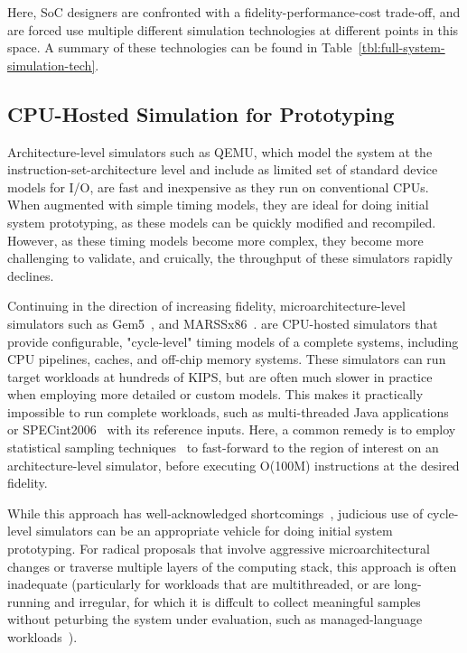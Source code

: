 Here, SoC designers are confronted with a fidelity-performance-cost trade-off,
and are forced use multiple different simulation technologies at different
points in this space. A summary of these technologies can be found in
Table~\ref{tbl:full-system-simulation-tech}.

\subsection{CPU-Hosted Simulation for Prototyping}\label{UArchSWSim}

Architecture-level simulators such as QEMU\cite{qemu}, which model the system at the
instruction-set-architecture level and include as limited set of standard
device models for I/O, are fast and inexpensive as they run on conventional CPUs.
When augmented with simple timing models, they are ideal for doing initial system prototyping, as
these models can be quickly modified and recompiled.
However, as these timing models become more complex, they become more
challenging to validate, and cruically, the throughput of these simulators rapidly declines.

Continuing in the direction of increasing fidelity, microarchitecture-level
simulators such as Gem5~\cite{gem5}, and MARSSx86~\cite{marssx86}. are CPU-hosted 
simulators that provide configurable, "cycle-level" timing models of a complete systems, including CPU pipelines,
caches, and off-chip memory systems.  These simulators can run target workloads at hundreds of KIPS, but are
often much slower in practice when employing more detailed or custom models. This
makes it practically impossible to run complete workloads, such as
multi-threaded Java applications or SPECint2006~\cite{spec} with its reference
inputs. Here, a common remedy is to employ statistical sampling
techniques~\cite{smarts} to fast-forward to the region of interest on an architecture-level simulator, before
executing O(100M) instructions at the desired fidelity.

While this approach has well-acknowledged shortcomings~\cite{gem5error},
judicious use of cycle-level simulators can be an appropriate vehicle for
doing initial system prototyping. For radical proposals that involve
aggressive microarchitectural changes or traverse multiple layers of the
computing stack, this approach is often inadequate (particularly for workloads that
are multithreaded, or are long-running and irregular, for which it is diffcult to collect 
meaningful samples without peturbing the system under evaluation, such as
managed-language workloads~\cite{MicroSimPanel}).


